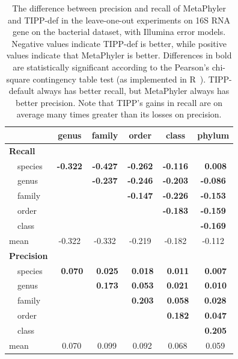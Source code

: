 \begin{table}[hptb]
\caption[Precision-Recall Differences on 16S RNA gene on 
bacteria, Illumina]{\label{tipp:difference.leaveout.illumina.bacteria} The difference between precision and 
recall of MetaPhyler and TIPP-def in the leave-one-out experiments on 
16S RNA gene on the bacterial dataset, with Illumina error models. Negative values
indicate TIPP-def is better, while positive values indicate that MetaPhyler is better. Differences in bold are statistically significant according to the Pearson's chi-square contingency table test (as implemented in R~\cite{R}). TIPP-default always has better recall, but MetaPhyler always has better precision. 
Note that TIPP's gains in recall are on average many times greater than its losses on precision.}
\begin{center}
\begin{tabular}{|l||c|c|c|c|c|} \hline
\multicolumn{1}{|l||}{}&\multicolumn{1}{c|}{genus}&\multicolumn{1}{c|}{family}&\multicolumn{1}{c|}{order}&\multicolumn{1}{c|}{class}&\multicolumn{1}{c|}{phylum}\\ \hline
{\bf Recall}&&&&&\\
~~species&{\bf -0.322}&{\bf -0.427}&{\bf -0.262}&{\bf -0.116}&{\bf ~0.008}\\ 
~~genus&&{\bf -0.237}  &{\bf -0.246}&{\bf -0.203}&{\bf -0.086}\\ 
~~family&&&{\bf -0.147}&{\bf -0.226}&{\bf -0.153}\\ 
~~order&&&&{\bf -0.183}&{\bf -0.159}\\ 
~~class&&&&&{\bf -0.169}\\ 
mean&-0.322&-0.332&-0.219&-0.182&-0.112\\ 
\hline
{\bf Precision}&&&&&\\
~~species&{\bf ~0.070}&{\bf ~0.025}&{\bf ~0.018}&{\bf ~0.011}&{\bf ~0.007}\\ 
~~genus&&{\bf ~0.173}&{\bf ~0.053}&~{\bf 0.021}&{\bf ~0.010}\\ 
~~family&&&{\bf ~0.203}&{\bf ~0.058}&~{\bf 0.028}\\ 
~~order&&&&{\bf ~0.182}&{\bf ~0.047}\\ 
~~class&&&&&{\bf ~0.205}\\ 
mean&~0.070&~0.099&~0.092&~0.068&~0.059\\ 
\hline
\end{tabular}
\end{center}
\end{table}


